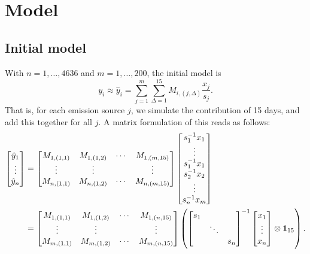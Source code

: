 \documentclass{article}
\begin{document}
\section{Model}
\subsection{Initial model}
With $n=1,\dots,4636$ and $m = 1,\dots,200$, the initial model is
$$
y_i \approx
\hat{y}_i = \sum_{j=1}^m \sum_{\Delta = 1}^{15}  M_{i,(j,\Delta)} \frac{x_{j}}{s_j}
.$$
That is, for each emission source $j$, we simulate the contribution of 15 days, and add this together for all $j$. A matrix formulation of this reads as follows:
\begin{align}
    \label{eq: initial model concise} 
\begin{bmatrix}
    \hat{y}_1 \\ 
    \vdots \\
    \hat{y}_{n}
\end{bmatrix}
&=
\begin{bmatrix}
    M_{1,(1,1)} & M_{1,(1,2)} & \cdots & M_{1,(m,15)} \\
    \vdots & \vdots & & \vdots \\
    M_{n,(1,1)} & M_{n,(1,2)} & \cdots & M_{n,(m,15)} \\
\end{bmatrix}
\begin{bmatrix}
    s_1^{-1} x_1\\
    \vdots \\
    s_1^{-1} x_1 \\
    s_2^{-1} x_2 \\
    \vdots \\
    s_n^{-1} x_m
\end{bmatrix} 
\\
&=
\begin{bmatrix}
    M_{1,(1,1)} & M_{1,(1,2)} & \cdots & M_{1,(n,15)} \\
    \vdots & \vdots & & \vdots \\
    M_{m,(1,1)} & M_{m,(1,2)} & \cdots & M_{m,(n,15)} \\
\end{bmatrix}
\left( 
     \begin{bmatrix}
        s_1 & & \\
         & \ddots & \\
        & & s_n
     \end{bmatrix}^{-1}
     \begin{bmatrix}
        x_1 \\
        \vdots \\
        x_n
     \end{bmatrix}
     \otimes \vb{1}_{15}
\right)
\nonumber
.\end{align}
\end{document}
